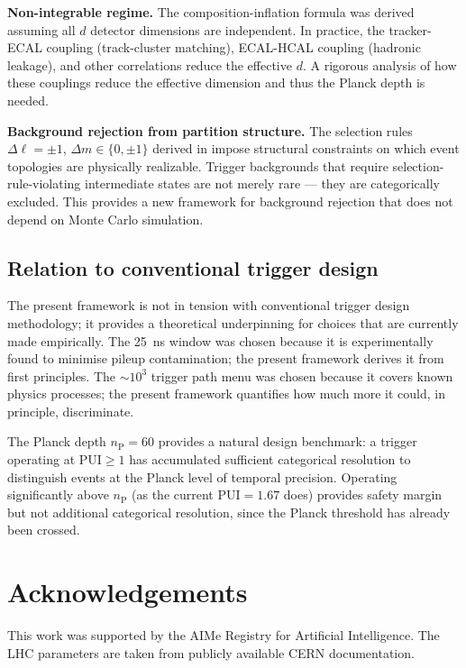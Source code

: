 \documentclass[twocolumn,10pt,a4paper]{article}
\theoremstyle{thmstyle}
\theoremstyle{definition}
\theoremstyle{remark}
\newcommand{\nP}{n_{\mathrm{P}}}
\newcommand{\PUI}{\mathrm{PUI}}
\begin{document}
\textbf{Non-integrable regime.} The composition-inflation formula was
derived assuming all $d$ detector dimensions are independent. In practice,
the tracker-ECAL coupling (track-cluster matching), ECAL-HCAL coupling
(hadronic leakage), and other correlations reduce the effective $d$. A
rigorous analysis of how these couplings reduce the effective dimension
and thus the Planck depth is needed.

\textbf{Background rejection from partition structure.} The selection rules
$\Delta\ell = \pm 1$, $\Delta m \in \{0, \pm 1\}$ derived in
\citet{companion:math} impose structural constraints on which event
topologies are physically realizable. Trigger backgrounds that require
selection-rule-violating intermediate states are not merely rare —
they are categorically excluded. This provides a new framework for
background rejection that does not depend on Monte Carlo simulation.

\subsection{Relation to conventional trigger design}

The present framework is not in tension with conventional trigger design
methodology; it provides a theoretical underpinning for choices that are
currently made empirically. The 25~ns window was chosen because it is
experimentally found to minimise pileup contamination; the present framework
derives it from first principles. The $\sim 10^3$ trigger path menu was
chosen because it covers known physics processes; the present framework
quantifies how much more it could, in principle, discriminate.

The Planck depth $\nP = 60$ provides a natural design benchmark: a trigger
operating at $\PUI \geq 1$ has accumulated sufficient categorical resolution
to distinguish events at the Planck level of temporal precision. Operating
significantly above $\nP$ (as the current $\PUI = 1.67$ does) provides safety
margin but not additional categorical resolution, since the Planck threshold
has already been crossed.

\section*{Acknowledgements}
This work was supported by the AIMe Registry for Artificial Intelligence.
The LHC parameters are taken from publicly available CERN documentation.



\end{document}
